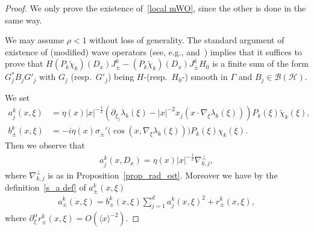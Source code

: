 \documentclass[AHL,Unicode,longabstracts,published]{cedram}
\renewcommand{\a}{\alpha}
\renewcommand{\l}{\lambda}
\newcommand{\x}{\xi}
\newcommand{\y}{\eta}
\newcommand{\s}{\sigma}
\newcommand{\HS}{\mathcal{H}}
\newcommand{\BS}{\mathcal{B}}
\newcommand{\jap}[1]{\langle #1 \rangle}
\newcommand{\HS}{\mathcal{H}}
\begin{document}
\begin{proof}
We only prove the existence of~\eqref{local mWO}, since the other is done in the same way.

We may assume $\rho<1$ without loss of generality. The standard argument of existence of (modified) wave operators (see, e.g., \cite[Lemmas~10.2.1 and 10.2.2, Theorem~0.5.4]{Y} and~\cite[Theorem~XIII. 24]{R-S4}) implies that it suffices to prove that $H (P_k \tilde\chi_k)(D_x)J_\pm^k - (P_k \tilde\chi_k)(D_x)J_\pm^k H_0$ is a finite sum of the form $G_j^* B_j G'_j$ with $G_j$ (resp.\ $G'_j$) being $H$-(resp.\ $H_0$-) smooth in $\Gamma$ and $B_j\in\BS(\HS)$.

We set
\begin{align*}
a_j^k(x,\x) &= \y(x)|x|^{-\frac{1}{2}}\left(\partial_{\x_j}\l_k(\x)-|x|^{-2} x_j \left(x\cdot\nabla_\x\l_k(\x)\right)\right) P_k(\x) \tilde\chi_k(\x), \\
b_{\pm}^k(x,\x) &= -i \y(x)\s_\pm'\bigl(\cos(x,\nabla_\x\lambda_k(\x)) \bigr) P_k(\x) \chi_k(\x).
\end{align*}
Then we observe that
\begin{align*}
a_j^k(x,D_x)=\y(x)|x|^{-\frac12}\nabla_{k,j}^\perp,
\end{align*}
where $\nabla_{k,j}^\perp$ is as in Proposition~\ref{prop_rad_est}. Moreover we have by the definition~\eqref{s_a def} of $a_\pm^k(x,\x)$
\begin{align*}
a_\pm^k(x,\x)=b_\pm^k(x,\x) \sum_{j=1}^d a_j^k(x,\x)^2 + r_\pm^k(x,\x),
\end{align*}
where $\partial_\x^\a r_\pm^k(x,\x) = O(\jap{x}^{-2})$.


\end{proof}
\end{document}
